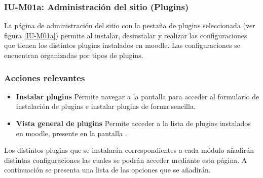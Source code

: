 \subsubsection{IU-M01a: Administración del sitio (Plugins)}

 La página de administración del sitio con la pestaña de plugins seleccionada (ver figura
 \ref{IU-M01a}) permite al  instalar, desinstalar y realizar las
 configuraciones que tienen los distintos plugins instalados en moodle. Las configuraciones se
 encuentran organizadas por tipos de plugins.


\subsubsection{Acciones relevantes}

    \begin{itemize}
    \item {\bf Instalar plugins}
        Permite navegar a la pantalla  para acceder al formulario de
        instalación de plugins e instalar plugins de forma sencilla.

    \item {\bf Vista general de plugins}
        Permite acceder a la lista de plugins instalados en moodle, presente en la pantalla
        .
    \end{itemize}

 \noindent
 Los distintos plugins que se instalarán correspondientes a cada módulo añadirán distintas
 configuraciones las cuales se podrán acceder mediante esta página. A continuación se presenta
 una lista de las opciones que se añadirán.


